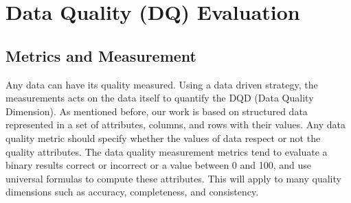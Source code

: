 \chapter{Data Quality (DQ) Evaluation}

\ifpdf
    \graphicspath{{Chapter3/Figs/Raster/}{Chapter3/Figs/PDF/}{Chapter3/Figs/}}
\else
    \graphicspath{{Chapter3/Figs/Vector/}{Chapter3/Figs/}}
\fi

\section{Metrics and Measurement}
Any data can have its quality measured. Using a data driven strategy, the measurements acts on the data itself to quantify the DQD (Data Quality Dimension). 
As mentioned before, our work is based on structured data represented in \cite{Juddoo} a set of attributes, 
columns, and rows with their values. Any data quality metric should specify whether the values of 
data respect or not the quality attributes. The data quality measurement metrics tend to evaluate a
binary results correct or incorrect or a value between 0 and 100, and use universal formulas to
compute these attributes. This will apply to many quality dimensions such as accuracy, completeness, and consistency.
 
